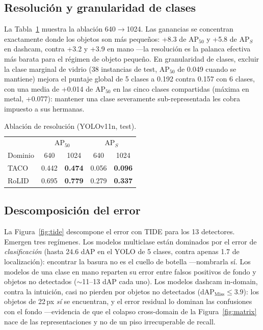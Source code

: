 \documentclass[conference]{IEEEtran}
\begin{document}
\subsection{Resolución y granularidad de clases}
La Tabla~\ref{tab:res} muestra la ablación 640$\rightarrow$1024. Las ganancias
se concentran exactamente donde los objetos son más pequeños: +8.3 de AP$_{50}$
y +5.8 de AP$_S$ en dashcam, contra +3.2 y +3.9 en mano ---la resolución es la
palanca efectiva más barata para el régimen de objeto pequeño. En granularidad
de clases, excluir la clase marginal de vidrio (38 instancias de test,
AP$_{50}$ de 0.049 cuando se mantiene) mejora el puntaje global de 5 clases a
0.192 contra 0.157 con 6 clases, con una media de +0.014 de AP$_{50}$ en las
cinco clases compartidas (máxima en metal, +0.077): mantener una clase
severamente sub-representada les cobra impuesto a sus hermanas.

\begin{table}[t]
\caption{Ablación de resolución (YOLOv11n, test).}
\label{tab:res}
\centering
\small
\begin{tabular}{lcccc}
\toprule
 & \multicolumn{2}{c}{AP$_{50}$} & \multicolumn{2}{c}{AP$_S$} \\
Dominio & 640 & 1024 & 640 & 1024 \\
\midrule
TACO & 0.442 & \textbf{0.474} & 0.056 & \textbf{0.096} \\
RoLID & 0.695 & \textbf{0.779} & 0.279 & \textbf{0.337} \\
\bottomrule
\end{tabular}
\end{table}

\subsection{Descomposición del error}
La Figura~\ref{fig:tide} descompone el error con TIDE para los 13 detectores.
Emergen tres regímenes. Los modelos multiclase están dominados por el error de
\emph{clasificación} (hasta 24.6 dAP en el YOLO de 5 clases, contra apenas 1.7
de localización): encontrar la basura no es el cuello de botella ---nombrarla
sí. Los modelos de una clase en mano reparten su error entre falsos positivos de
fondo y objetos no detectados ($\sim$11--13 dAP cada uno). Los modelos dashcam
in-domain, contra la intuición, casi no pierden por objetos no detectados
(dAP$_{\text{Miss}}\!\le\!3.9$): los objetos de 22\,px \emph{sí} se encuentran,
y el error residual lo dominan las confusiones con el fondo ---evidencia de que
el colapso cross-domain de la Figura~\ref{fig:matrix} nace de las
representaciones y no de un piso irrecuperable de recall.
\end{document}
